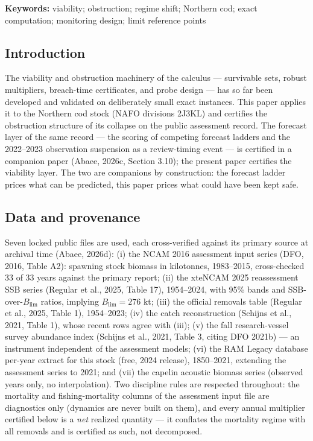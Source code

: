 \documentclass[10pt,twocolumn]{article}
\theoremstyle{plain}
\theoremstyle{remark}
\begin{document}
\textbf{Keywords:} viability; obstruction; regime shift; Northern cod;
exact computation; monitoring design; limit reference points

\subsection{Introduction}\label{intro}

The viability and obstruction machinery of the calculus --- survivable
sets, robust multipliers, breach-time certificates, and probe design ---
has so far been developed and validated on deliberately small exact
instances. This paper applies it to the Northern cod stock (NAFO
divisions 2J3KL) and certifies the obstruction structure of its
collapse on the public assessment record. The forecast layer of the
same record --- the scoring of competing forecast ladders and the
2022--2023 observation suspension as a review-timing event --- is
certified in a companion paper (Abaee, 2026c, Section 3.10); the
present paper certifies the viability layer. The two are companions by
construction: the forecast ladder prices what can be predicted, this
paper prices what could have been kept safe.

\subsection{Data and provenance}\label{data}

Seven locked public files are used, each cross-verified against its
primary source at archival time (Abaee, 2026d): (i) the NCAM 2016
assessment input series (DFO, 2016, Table A2): spawning stock biomass
in kilotonnes, 1983--2015, cross-checked 33 of 33 years against the
primary report; (ii) the xteNCAM 2025 reassessment SSB series (Regular
et al., 2025, Table 17), 1954--2024, with 95\% bands and
SSB-over-\(B_{\mathrm{lim}}\) ratios, implying \(B_{\mathrm{lim}} = 276\)
kt; (iii) the official removals table (Regular et al., 2025, Table 1),
1954--2023; (iv) the catch reconstruction (Schijns et al., 2021, Table
1), whose recent rows agree with (iii); (v) the fall research-vessel
survey abundance index (Schijns et al., 2021, Table 3, citing DFO
2021b) --- an instrument independent of the assessment models; (vi) the
RAM Legacy database per-year extract for this stock (free, 2024
release), 1850--2021, extending the assessment series to 2021; and
(vii) the capelin acoustic biomass series (observed years only, no
interpolation). Two discipline rules are respected throughout: the
mortality and fishing-mortality columns of the assessment input file
are diagnostics only (dynamics are never built on them), and every
annual multiplier certified below is a \emph{net} realized quantity ---
it conflates the mortality regime with all removals and is certified as
such, not decomposed.
\end{document}
